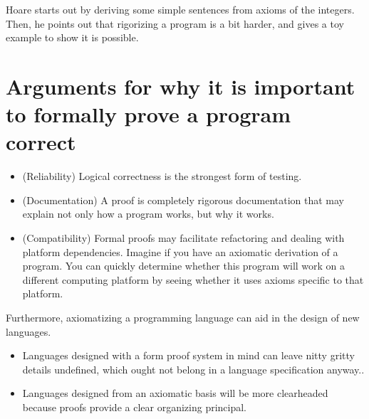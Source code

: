 \documentclass[11pt]{article}
\begin{document}
Hoare starts out by deriving some simple sentences from axioms of the
integers. Then, he points out that rigorizing a program is a bit
harder, and gives a toy example to show it is possible.

\section{Arguments for why it is important to formally prove a program correct}

\begin{itemize}
\item (Reliability) Logical correctness is the strongest form of testing.
\item (Documentation) A proof is completely rigorous documentation that may explain
  not only how a program works, but why it works.
\item (Compatibility) Formal proofs may facilitate refactoring and dealing with
  platform dependencies. Imagine if you have an axiomatic derivation
  of a program. You can quickly determine whether this program will
  work on a different computing platform by seeing whether it uses
  axioms specific to that platform.
\end{itemize}

Furthermore, axiomatizing a programming language can aid in the design
of new languages.

\begin{itemize}
\item Languages designed with a form proof system in mind can leave
  nitty gritty details undefined, which ought not belong in a language
  specification anyway..
\item Languages designed from an axiomatic basis will be more
  clearheaded because proofs provide a clear organizing principal.
\end{itemize}
\end{document}
